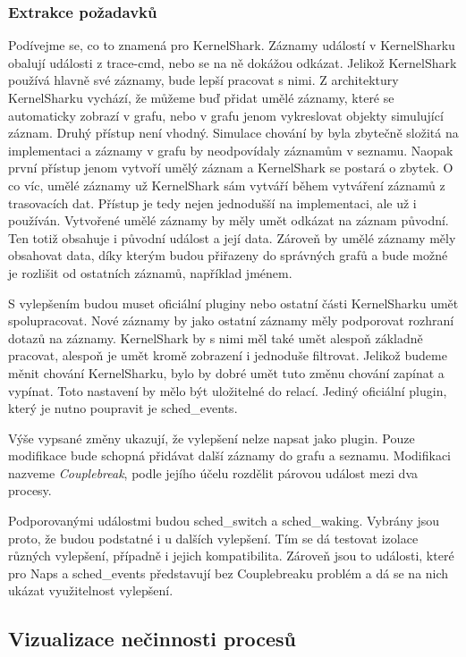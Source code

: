 \subsubsection*{Extrakce požadavků}
Podívejme se, co to znamená pro KernelShark. Záznamy událostí v KernelSharku obalují události z trace-cmd, nebo se na ně dokážou odkázat. Jelikož KernelShark používá hlavně své záznamy, bude lepší pracovat s nimi. Z architektury KernelSharku vychází, že můžeme buď přidat umělé záznamy, které se automaticky zobrazí v grafu, nebo v grafu jenom vykreslovat objekty simulující záznam. Druhý přístup není vhodný. Simulace chování by byla zbytečně složitá na implementaci a záznamy v grafu by neodpovídaly záznamům v seznamu. Naopak první přístup jenom vytvoří umělý záznam a KernelShark se postará o zbytek. O co víc, umělé záznamy už KernelShark sám vytváří během vytváření záznamů z trasovacích dat. Přístup je tedy nejen jednodušší na implementaci, ale už i používán. Vytvořené umělé záznamy by měly umět odkázat na záznam původní. Ten totiž obsahuje i původní událost a její data. Zároveň by umělé záznamy měly obsahovat data, díky kterým budou přiřazeny do správných grafů a bude možné je rozlišit od ostatních záznamů, například jménem.

S vylepšením budou muset oficiální pluginy nebo ostatní části KernelSharku umět spolupracovat. Nové záznamy by jako ostatní záznamy měly podporovat rozhraní dotazů na záznamy. KernelShark by s nimi měl také umět alespoň základně pracovat, alespoň je umět kromě zobrazení i jednoduše filtrovat. Jelikož budeme měnit chování KernelSharku, bylo by dobré umět tuto změnu chování zapínat a vypínat. Toto nastavení by mělo být uložitelné do relací. Jediný oficiální plugin, který je nutno poupravit je sched\_events.

Výše vypsané změny ukazují, že vylepšení nelze napsat jako plugin. Pouze modifikace bude schopná přidávat další záznamy do grafu a seznamu. Modifikaci nazveme \emph{Couplebreak}, podle jejího účelu rozdělit párovou událost mezi dva procesy.

Podporovanými událostmi budou sched\_switch a sched\_waking. Vybrány jsou proto, že budou podstatné i u dalších vylepšení. Tím se dá testovat izolace různých vylepšení, případně i jejich kompatibilita. Zároveň jsou to události, které pro Naps a sched\_events představují bez Couplebreaku problém a dá se na nich ukázat využitelnost vylepšení.

\subsection{Vizualizace nečinnosti procesů}

